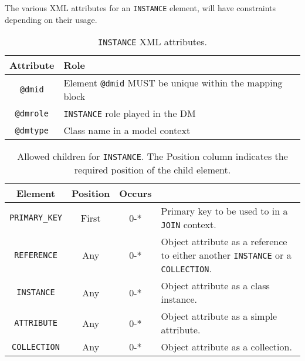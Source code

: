 The various XML attributes for an \texttt{INSTANCE} element, will have constraints depending on their usage.
  
\begin{table}[!htbp]
\small
\centering
\begin{tabulary}{\linewidth}{|c|J|}       
       \hline 
            \textbf{Attribute} & 
            \textbf {Role}\\
       \hline         \hline  
            \texttt{@dmid} & 
            Element  \texttt{@dmid}  MUST be unique within the mapping block  \\
        \hline 
            \texttt{@dmrole} & 
            \texttt{INSTANCE} role played in the DM \\
        \hline 
            \texttt{@dmtype} & 
            Class name in a model context\\
        \hline 
     \end{tabulary}
     \caption{\texttt{INSTANCE} XML attributes.} 
     \label{tbl:instance-att}
 \end{table}   
 


 
\begin{table}[!htbp]
\small
\centering
\begin{tabulary}{\linewidth}{|c |c |c|J|}
    \hline 
        \textbf{Element} &
        \textbf{Position} &
        \textbf{Occurs} &
        \\
    \hline      \hline  
        \texttt{PRIMARY\_KEY}  &        
        First &           
        0-* &
        Primary key to be used to in a \texttt{JOIN} context.\\
    \hline    
        \texttt{REFERENCE}  &        
        Any &           
        0-* &
         Object attribute as a reference to either another \texttt{INSTANCE} or a \texttt{COLLECTION}. \\
    \hline    
        \texttt{INSTANCE} &           
        Any &           
        0-* &
         Object attribute as a class instance. \\
    \hline    
        \texttt{ATTRIBUTE} &           
        Any &           
        0-* &
       Object attribute as a simple attribute. \\
    \hline    
        \texttt{COLLECTION} &           
        Any &           
        0-* &
         Object attribute  as a collection.\\
    \hline 
\end{tabulary}
     \caption{Allowed children for \texttt{INSTANCE}. The Position column indicates the required position of the child element.} 
     \label{tbl:instance-chilren}
\end{table}
 
